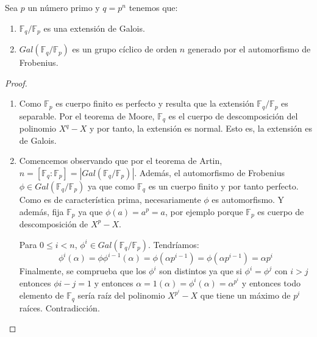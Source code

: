 \begin{theorem}
Sea $p$ un número primo y $q = p^n$ tenemos que:

\begin{enumerate}
\item $\mathbb{F}_q/\mathbb{F}_p$ es una extensión de Galois. 
\item $Gal(\mathbb{F}_q/\mathbb{F}_p)$ es un grupo cíclico de orden $n$ generado por el automorfismo de Frobenius. 
\end{enumerate}
\end{theorem}
\begin{proof}
\begin{enumerate}
\item Como $\mathbb{F}_p$ es cuerpo finito es perfecto y resulta que la extensión $\mathbb{F}_q/\mathbb{F}_p$ es separable. Por el teorema de Moore, $\mathbb{F}_q$ es el cuerpo de descomposición del polinomio $X^q - X$ y por tanto, la extensión es normal. Esto es, la extensión es de Galois. 

\item Comencemos observando que por el teorema de Artin, $n = [\mathbb{F}_q:\mathbb{F}_p] = |Gal(\mathbb{F}_q/\mathbb{F}_p)|$. Además, el automorfismo de Frobenius $\phi \in Gal(\mathbb{F}_q/\mathbb{F}_p)$ ya que como $\mathbb{F}_q$ es un cuerpo finito y por tanto perfecto. Como es de característica prima, necesariamente $\phi$ es automorfismo. Y además, fija $\mathbb{F}_p$ ya que $\phi(a) = a^p = a$, por ejemplo porque $\mathbb{F}_p$ es cuerpo de descomposición de $X^p - X$. 

Para $0 \le i < n$, $\phi^i \in Gal(\mathbb{F}_q/\mathbb{F}_p)$. Tendríamos: $$\phi^i(\alpha) = \phi \phi^{i-1}(\alpha) = \phi(\alpha{p^{i-1}}) = \phi(\alpha{p^{i-1}}) = \alpha{p^i}$$ Finalmente, se comprueba que los $\phi^i$ son distintos ya que si $\phi^i = \phi^j$ con $i > j$ entonces $\phi{i-j} = 1$ y entonces $\alpha = 1(\alpha) = \phi^i(\alpha) = \alpha^{p^i}$ y entonces todo elemento de $\mathbb{F}_q$ sería raíz del polinomio $X^{p^i} - X$ que tiene un máximo de $p^i$ raíces. Contradicción. 
\end{enumerate}
\end{proof}

